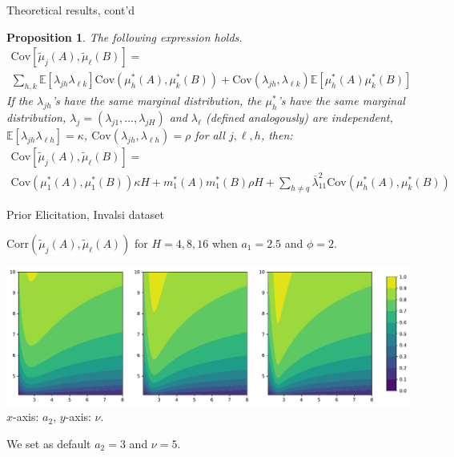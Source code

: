 \documentclass[10.5pt, aspectratio=169]{beamer} %
\newcommand{\E}{\mathbb{E}}
\newcommand{\mutilde}{\widetilde{\mu}}
\newcommand{\Cov}{\mathrm{Cov}}
\newtheorem{proposition}{Proposition}
\begin{document}
\begin{frame}{Theoretical results, cont'd}


\begin{proposition}
The following expression holds.
    \begin{multline*}
        \Cov\left[\mutilde_j(A), \mutilde_\ell(B)\right]  =  \\ \sum_{h, k} \E[\lambda_{jh} \lambda_{\ell k}] \Cov (\mu^*_h(A), \mu^*_k(B)) + \Cov(\lambda_{jh}, \lambda_{\ell k}) \E[\mu^*_h(A) \mu^*_k(B)] 
    \end{multline*}
    If the $\lambda_{jh}$'s have the same marginal distribution, the $\mu^*_h$'s have the same marginal distribution, $\lambda_j = (\lambda_{j1}, \ldots, \lambda_{jH})$ and $\lambda_\ell$ (defined analogously) are independent, $\E[\lambda_{jh} \lambda_{\ell h}] = \kappa$,  $\Cov(\lambda_{jh}, \lambda_{\ell h}) = \rho$ for all $j, \ell, h$, then:
    \begin{multline*}
	\Cov\left[\mutilde_j(A), \mutilde_\ell(B)\right]  =  \\ \Cov(\mu^*_1(A), \mu^*_1(B)) \kappa H + m^*_1(A) m^*_1(B) \rho H + \sum_{h \neq q} \bar \lambda_{11}^2  \Cov(\mu^*_h(A), \mu^*_k(B))
\end{multline*}
%
\end{proposition}
\end{frame}



\begin{frame}{Prior Elicitation, Invalsi dataset}

$\mbox{Corr}(\mutilde_j(A), \mutilde_\ell(A))$ for $H=4, 8, 16$ when $a_1 = 2.5$ and $\phi=2$.

\vspace{0.5cm}

\begin{center}
	\includegraphics[width=0.9\linewidth]{corr_mgp} \\
	$x$-axis: $a_2$, $y$-axis: $\nu$.
\end{center}

\pause

\medskip

We set as default $a_2 = 3$ and $\nu=5$.
\end{frame}
\end{document}
